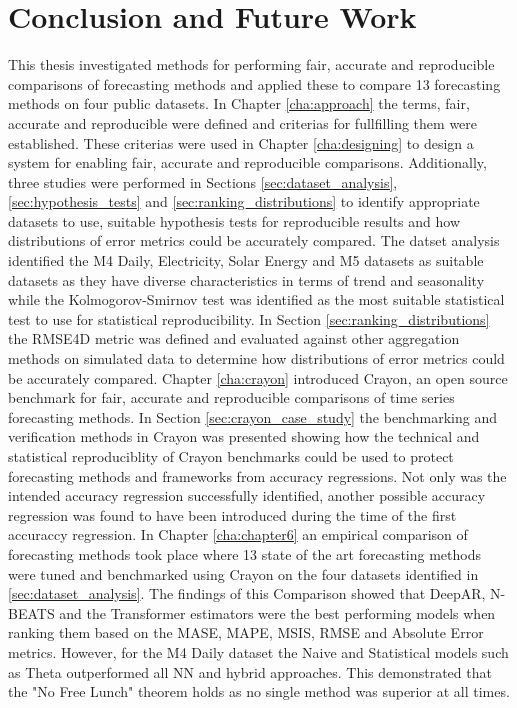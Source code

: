 \chapter{Conclusion and Future Work}
\label{cha:chapter7}
This thesis investigated methods for performing fair, accurate and reproducible comparisons of forecasting methods and applied these to compare 13 forecasting methods on four public datasets. In Chapter \ref{cha:approach} the terms, fair, accurate and reproducible were defined and criterias for fullfilling them were established. These criterias were used in Chapter \ref{cha:designing} to design a system for enabling fair, accurate and reproducible comparisons. Additionally, three studies were performed in Sections \ref{sec:dataset_analysis}, \ref{sec:hypothesis_tests} and \ref{sec:ranking_distributions} to identify appropriate datasets to use, suitable hypothesis tests for reproducible results and how distributions of error metrics could be accurately compared. The datset analysis identified the M4 Daily, Electricity, Solar Energy and M5 datasets as suitable datasets as they have diverse characteristics in terms of trend and seasonality while the Kolmogorov-Smirnov test was identified as the most suitable statistical test to use for statistical reproducibility. In Section \ref{sec:ranking_distributions} the RMSE4D metric was defined and evaluated against other aggregation methods on simulated data to determine how distributions of error metrics could be accurately compared. Chapter \ref{cha:crayon} introduced Crayon, an open source benchmark for fair, accurate and reproducible comparisons of time series forecasting methods. In Section \ref{sec:crayon_case_study} the benchmarking and verification methods in Crayon was presented showing how the technical and statistical reproduciblity of Crayon benchmarks could be used to protect forecasting methods and frameworks from accuracy regressions. Not only was the intended accuracy regression successfully identified, another possible accuracy regression was found to have been introduced during the time of the first accuraccy regression. In Chapter \ref{cha:chapter6} an empirical comparison of forecasting methods took place where 13 state of the art forecasting methods were tuned and benchmarked using Crayon on the four datasets identified in \ref{sec:dataset_analysis}. The findings of this Comparison showed that DeepAR, N-BEATS and the Transformer estimators were the best performing models when ranking them based on the MASE, MAPE, MSIS, RMSE and Absolute Error metrics. However, for the M4 Daily dataset the Naive and Statistical models such as Theta outperformed all NN and hybrid approaches. This demonstrated that the "No Free Lunch" theorem holds as no single method was superior at all times.

